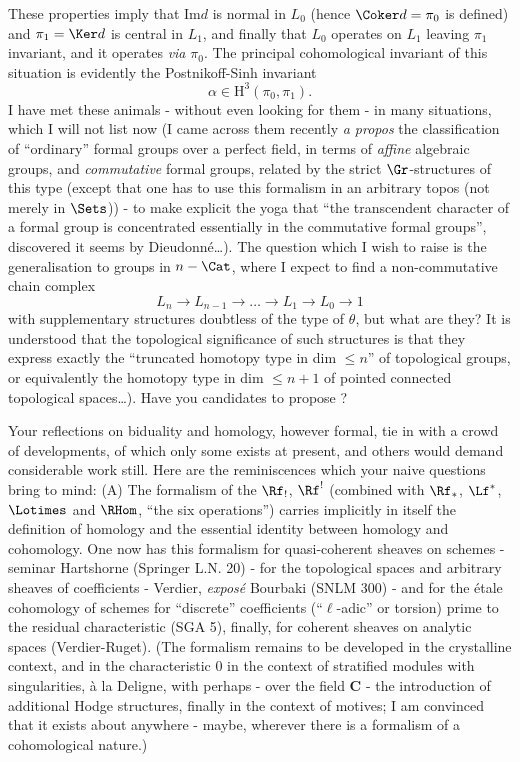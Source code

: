 These properties imply that $\text{Im}d$ is normal in $L_0$ (hence $\Coker d = \pi_0$ is defined) and $\pi_1 = \Ker d$ is central in $L_1$, and finally that $L_0$ operates on $L_1$ leaving $\pi_1$ invariant, and it operates \emph{via} $\pi_0$. The principal cohomological invariant of this situation is evidently the Postnikoff-Sinh invariant
$$
\alpha \in \mathrm H^3 (\pi_0, \pi_1).
$$
I have met these animals - without even looking for them - in many situations, which I will not list now (I came across them recently \emph{a propos} the classification of ``ordinary'' formal groups over a perfect field, in terms of \emph{affine} algebraic groups, and \emph{commutative} formal groups, related by the strict $\Gr$-structures of this type (except that one has to use this formalism in an arbitrary topos (not merely in $\Sets$)) - to make explicit the yoga that ``the transcendent character of a formal group is concentrated essentially in the commutative formal groups'', discovered it seems by Dieudonné\dots). The question which I wish to raise is the generalisation to groups in $n-\Cat$, where I expect to find a non-commutative chain complex
$$
L_n \to L_{n-1} \to \dots \to L_1 \to L_0 \to 1
$$
with supplementary structures doubtless of the type of $\theta$, but what are they? It is understood that the topological significance of such structures is that they express exactly the ``truncated homotopy type in dim $\leq n$'' of topological groups, or equivalently the homotopy type in dim $\leq n + 1$ of pointed connected topological spaces\dots). Have you candidates to propose ?

\starsbreak

\label{sec:app10}%
Your reflections on biduality and homology, however formal, tie in with a crowd of developments, of which only some exists at present, and others would demand considerable work still. Here are the reminiscences which your naive questions bring to mind:
(A) The formalism of the $\Rf_!$, $\Rf^!$ (combined with $\Rf_*$, $\Lf^*$, $\Lotimes$ and $\RHom$, ``the six operations'') carries implicitly in itself the definition of homology and the essential identity between homology and cohomology. One now has this formalism for quasi-coherent sheaves on schemes - seminar Hartshorne (Springer L.N. 20) - for the topological spaces and arbitrary sheaves of coefficients - Verdier, \emph{exposé} Bourbaki (SNLM 300) - and for the étale cohomology of schemes for ``discrete'' coefficients (``$\ell$-adic'' or torsion) prime to the residual characteristic (SGA 5), finally, for coherent sheaves on analytic spaces (Verdier-Ruget). (The formalism remains to be developed in the crystalline context, and in the characteristic 0 in the context of stratified modules with singularities, à la Deligne, with perhaps - over the field $\mathbf{C}$ - the introduction of additional Hodge structures, finally in the context of motives; I am convinced that it exists about anywhere - maybe, wherever there is a formalism of a cohomological nature.)
    
